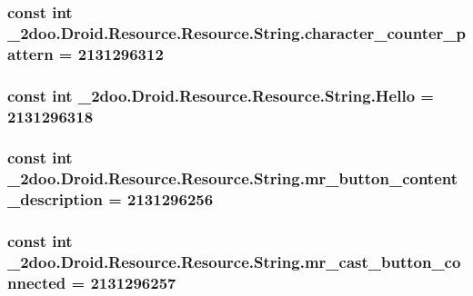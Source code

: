 \hypertarget{class__2doo_1_1_droid_1_1_resource_1_1_string_4bf5791a0319902baf911088d1dd3b6a}{
\subsubsection[{character\_\-counter\_\-pattern}]{\setlength{\rightskip}{0pt plus 5cm}const int \_\-2doo.Droid.Resource.Resource.String.character\_\-counter\_\-pattern = 2131296312}}
\label{class__2doo_1_1_droid_1_1_resource_1_1_string_4bf5791a0319902baf911088d1dd3b6a}


\hypertarget{class__2doo_1_1_droid_1_1_resource_1_1_string_c28de261fc5963d8aba54c83157abd40}{
\subsubsection[{Hello}]{\setlength{\rightskip}{0pt plus 5cm}const int \_\-2doo.Droid.Resource.Resource.String.Hello = 2131296318}}
\label{class__2doo_1_1_droid_1_1_resource_1_1_string_c28de261fc5963d8aba54c83157abd40}


\hypertarget{class__2doo_1_1_droid_1_1_resource_1_1_string_8baac646b569af1a40406cd468536fbd}{
\subsubsection[{mr\_\-button\_\-content\_\-description}]{\setlength{\rightskip}{0pt plus 5cm}const int \_\-2doo.Droid.Resource.Resource.String.mr\_\-button\_\-content\_\-description = 2131296256}}
\label{class__2doo_1_1_droid_1_1_resource_1_1_string_8baac646b569af1a40406cd468536fbd}


\hypertarget{class__2doo_1_1_droid_1_1_resource_1_1_string_ec89730159c74ed6a6e6782535a8bdbf}{
\subsubsection[{mr\_\-cast\_\-button\_\-connected}]{\setlength{\rightskip}{0pt plus 5cm}const int \_\-2doo.Droid.Resource.Resource.String.mr\_\-cast\_\-button\_\-connected = 2131296257}}
\label{class__2doo_1_1_droid_1_1_resource_1_1_string_ec89730159c74ed6a6e6782535a8bdbf}


